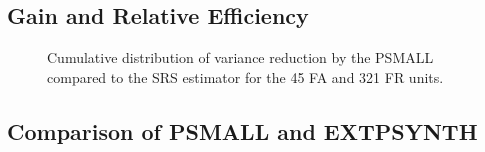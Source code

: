 \newpage
\subsection{Gain and Relative Efficiency}
\label{sec:gain_releff}



















\begin{figure}[H]
	\centering
	\caption{Cumulative distribution of variance reduction by the PSMALL compared to the SRS estimator for the  45 FA and 321 FR units.}
	\label{fig:gain}
\end{figure}

\newpage
\subsection{Comparison of PSMALL and EXTPSYNTH}
\label{sec:comp}
















